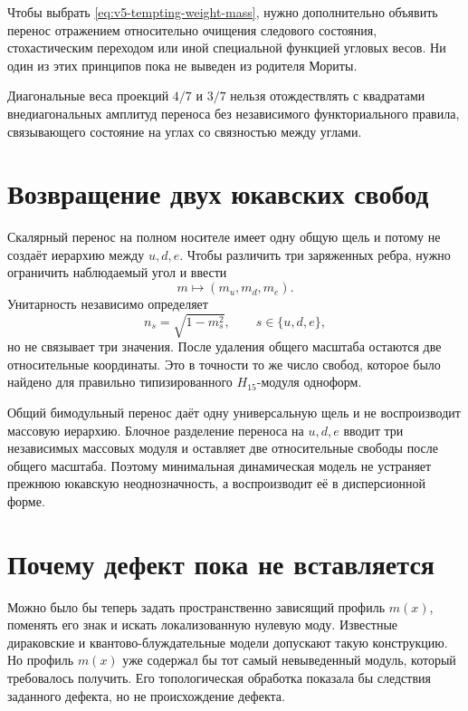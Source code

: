 Чтобы выбрать \eqref{eq:v5-tempting-weight-mass}, нужно дополнительно
объявить перенос отражением относительно очищения следового состояния,
стохастическим переходом или иной специальной функцией угловых весов. Ни
один из этих принципов пока не выведен из родителя Мориты.

\begin{nogocriterion}
Диагональные веса проекций $4/7$ и $3/7$ нельзя отождествлять с квадратами
внедиагональных амплитуд переноса без независимого функториального правила,
связывающего состояние на углах со связностью между углами.
\end{nogocriterion}

\section{Возвращение двух юкавских свобод}

Скалярный перенос на полном носителе имеет одну общую щель и потому не
создаёт иерархию между $u,d,e$. Чтобы различить три заряженных ребра, нужно
ограничить наблюдаемый угол и ввести
\begin{equation}
 m\longmapsto(m_u,m_d,m_e).
\end{equation}
Унитарность независимо определяет
\begin{equation}
 n_s=\sqrt{1-m_s^2},
 \qquad s\in\{u,d,e\},
\end{equation}
но не связывает три значения. После удаления общего масштаба остаются две
относительные координаты. Это в точности то же число свобод, которое было
найдено для правильно типизированного $H_{15}$-модуля одноформ.

\begin{proposition}
Общий бимодульный перенос даёт одну универсальную щель и не воспроизводит
массовую иерархию. Блочное разделение переноса на $u,d,e$ вводит три
независимых массовых модуля и оставляет две относительные свободы после
общего масштаба. Поэтому минимальная динамическая модель не устраняет
прежнюю юкавскую неоднозначность, а воспроизводит её в дисперсионной форме.
\end{proposition}

\section{Почему дефект пока не вставляется}

Можно было бы теперь задать пространственно зависящий профиль $m(x)$,
поменять его знак и искать локализованную нулевую моду. Известные
дираковские и квантово-блуждательные модели допускают такую конструкцию.
Но профиль $m(x)$ уже содержал бы тот самый невыведенный модуль, который
требовалось получить. Его топологическая обработка показала бы следствия
заданного дефекта, но не происхождение дефекта.

